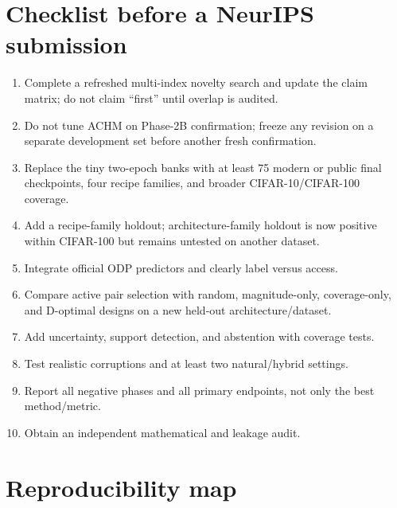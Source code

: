 \documentclass[11pt,a4paper]{article}
\newcommand{\Rtwo}{\mathrm{R2}}
\newcommand{\Rthree}{\mathrm{R3}}
\begin{document}
\section{Checklist before a NeurIPS submission}

\begin{enumerate}
  \item Complete a refreshed multi-index novelty search and update the claim
  matrix; do not claim ``first'' until overlap is audited.
  \item Do not tune ACHM on Phase-2B confirmation; freeze any revision on a
  separate development set before another fresh confirmation.
  \item Replace the tiny two-epoch banks with at least 75 modern or public
  final checkpoints, four recipe families, and broader CIFAR-10/CIFAR-100
  coverage.
  \item Add a recipe-family holdout; architecture-family holdout is now
  positive within CIFAR-100 but remains untested on another dataset.
  \item Integrate official ODP predictors and clearly label \Rtwo{} versus
  \Rthree{} access.
  \item Compare active pair selection with random, magnitude-only, coverage-only,
  and D-optimal designs on a new held-out architecture/dataset.
  \item Add uncertainty, support detection, and abstention with coverage tests.
  \item Test realistic corruptions and at least two natural/hybrid settings.
  \item Report all negative phases and all primary endpoints, not only the best
  method/metric.
  \item Obtain an independent mathematical and leakage audit.
\end{enumerate}

\section{Reproducibility map}
\end{document}
